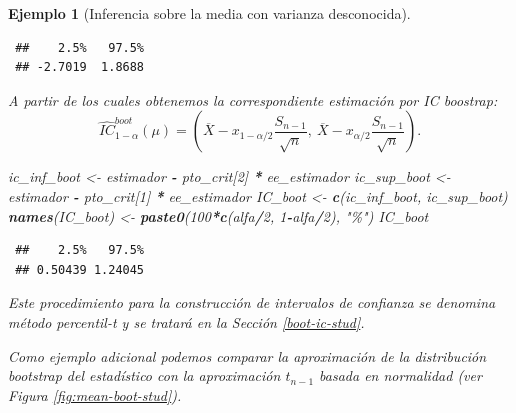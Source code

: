\documentclass[
  spanish,
  10pt,
]{book}
\newenvironment{Shaded}{\begin{snugshade}}{\end{snugshade}}
\newcommand{\DecValTok}[1]{\textcolor[rgb]{0.00,0.00,0.81}{#1}}
\newcommand{\FunctionTok}[1]{\textcolor[rgb]{0.13,0.29,0.53}{\textbf{#1}}}
\newcommand{\NormalTok}[1]{#1}
\newcommand{\OtherTok}[1]{\textcolor[rgb]{0.56,0.35,0.01}{#1}}
\newcommand{\SpecialCharTok}[1]{\textcolor[rgb]{0.81,0.36,0.00}{\textbf{#1}}}
\newcommand{\StringTok}[1]{\textcolor[rgb]{0.31,0.60,0.02}{#1}}
\theoremstyle{break}
\newtheorem{example}{Ejemplo}[chapter]
\theoremstyle{nonumberplain}
\begin{document}
\begin{example}[Inferencia sobre la media con varianza desconocida]
\begin{verbatim}
 ##    2.5%   97.5% 
 ## -2.7019  1.8688
\end{verbatim}

A partir de los cuales obtenemos la correspondiente estimación por IC boostrap:
\[\hat{IC}^{boot}_{1-\alpha}\left(  \mu\right)  = 
\left(  \overline{X}-x_{1-\alpha/2}\dfrac{S_{n-1}}{\sqrt{n}},\ \overline{X} 
- x_{\alpha/2}\dfrac{S_{n-1}}{\sqrt{n}} \right).\]

\begin{Shaded}
\begin{Highlighting}[]
\NormalTok{ic\_inf\_boot }\OtherTok{\textless{}{-}}\NormalTok{ estimador }\SpecialCharTok{{-}}\NormalTok{ pto\_crit[}\DecValTok{2}\NormalTok{] }\SpecialCharTok{*}\NormalTok{ ee\_estimador}
\NormalTok{ic\_sup\_boot }\OtherTok{\textless{}{-}}\NormalTok{ estimador }\SpecialCharTok{{-}}\NormalTok{ pto\_crit[}\DecValTok{1}\NormalTok{] }\SpecialCharTok{*}\NormalTok{ ee\_estimador}
\NormalTok{IC\_boot }\OtherTok{\textless{}{-}} \FunctionTok{c}\NormalTok{(ic\_inf\_boot, ic\_sup\_boot)}
\FunctionTok{names}\NormalTok{(IC\_boot) }\OtherTok{\textless{}{-}} \FunctionTok{paste0}\NormalTok{(}\DecValTok{100}\SpecialCharTok{*}\FunctionTok{c}\NormalTok{(alfa}\SpecialCharTok{/}\DecValTok{2}\NormalTok{, }\DecValTok{1}\SpecialCharTok{{-}}\NormalTok{alfa}\SpecialCharTok{/}\DecValTok{2}\NormalTok{), }\StringTok{"\%"}\NormalTok{)}
\NormalTok{IC\_boot}
\end{Highlighting}
\end{Shaded}

\begin{verbatim}
 ##    2.5%   97.5% 
 ## 0.50439 1.24045
\end{verbatim}

Este procedimiento para la construcción de intervalos de confianza se denomina \emph{método percentil-t} y se tratará en la Sección \ref{boot-ic-stud}.

Como ejemplo adicional podemos comparar la aproximación de la distribución bootstrap del estadístico con la aproximación \(t_{n-1}\) basada en normalidad (ver Figura \ref{fig:mean-boot-stud}).


\end{example}
\end{document}
